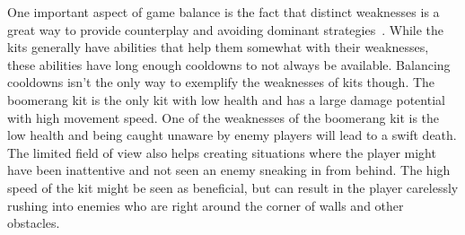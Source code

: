 One important aspect of game balance is the fact that distinct weaknesses is a great way to provide counterplay and avoiding dominant strategies~\cite{gameBalanceWeaknesses}. While the kits generally have abilities that help them somewhat with their weaknesses, these abilities have long enough cooldowns to not always be available. Balancing cooldowns isn't the only way to exemplify the weaknesses of kits though. 
The boomerang kit is the only kit with low health and has a large damage potential with high movement speed. One of the weaknesses of the boomerang kit is the low health and being caught unaware by enemy players will lead to a swift death. The limited field of view also helps creating situations where the player might have been inattentive and not seen an enemy sneaking in from behind. The high speed of the kit might be seen as beneficial, but can result in the player carelessly rushing into enemies who are right around the corner of walls and other obstacles. 